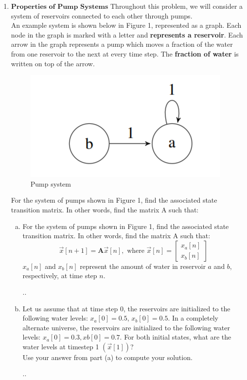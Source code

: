 \documentclass[11pt]{article}
\def\A{\textbf{A}} %
\begin{document}
\begin{enumerate}
	      \newpage
	\item $\textbf{Properties of Pump Systems}$
	      Throughout this problem, we will consider a system of reservoirs connected to each other through pumps.\\An example system is shown below in Figure 1, represented as a graph. Each node in the graph is marked with a letter and \textbf{represents a reservoir}. Each arrow in the graph represents a pump which moves a fraction of the water from one reservoir to the next at every time step. The \textbf{fraction of water} is written on top of the arrow.
	      \begin{figure}[h]
	      	\centering
	      	\includegraphics[scale=0.9]{q4a}
	      	\caption{ Pump system}
	      \end{figure}
	              
	      For the system of pumps shown in Figure 1, find the associated state transition matrix. In other words, find the matrix A such that:
	      \begin{enumerate}[(a)]
	      	\item For the system of pumps shown in Figure 1, find the associated state transition matrix. In other words, find the matrix A such that:
	      	      \[
	      	      	\vec{x}[n+1] = \A\vec{x}[n],\text{ where }\vec x[n] = \begin{bmatrix}
	      	      	x_a[n] \\
	      	      	x_b[n]
	      	      	\end{bmatrix}
	      	      \]
	      	      $x_a[n]$ and $x_b[n]$ represent the amount of water in reservoir $a$ and $b$, respectively, at time step $n$.
	      	      \begin{Answer}
	      	      	..
	      	      \end{Answer}
	      	                  
	      	      \newpage
	      	                  
	      	\item Let us assume that at time step 0, the reservoirs are initialized to the following water levels: $x_a[0] = 0.5$, $x_b[0] = 0.5$. In a completely alternate universe, the reservoirs are initialized to the following water levels: $x_a[0] = 0.3, xb[0] = 0.7$. For both initial states, what are the water levels at timestep 1 $(\vec x[1])$?\\Use your answer from part (a) to compute your solution.
	      	      \begin{Answer}
	      	      	..
	      	      \end{Answer}
	      	                  

\end{enumerate}
\end{enumerate}
\end{document}

